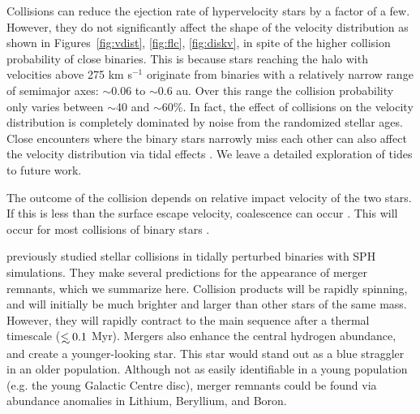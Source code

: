 \documentclass[fleqn,usenatbib]{mnras}
\newcommand\lsim{\mathrel{\rlap{\lower4pt\hbox{\hskip1pt$\sim$}}
    \raise1pt\hbox{$<$}}}
\begin{document}
Collisions can reduce the ejection rate of hypervelocity stars by a factor of a few. However, they do not significantly affect the shape of the velocity distribution as shown in Figures~\ref{fig:vdist}, \ref{fig:flc}, \ref{fig:diskv}, in spite of the higher collision probability of close binaries. This is because stars reaching the halo with velocities above 275 km s$^{-1}$  originate from binaries with a relatively narrow range of semimajor axes: $\sim$0.06 to $\sim$0.6 au. Over this range the collision probability only varies between $\sim$40 and $\sim$60\%. In fact, the effect of collisions on the velocity distribution is completely dominated by noise from the randomized stellar ages. Close encounters where the binary stars narrowly miss each other can also affect the velocity distribution via tidal effects \citep{bradnick+2017}. We leave a detailed exploration of tides to future work.




The outcome of the collision depends on relative impact velocity of the two stars. If this is less than the surface escape velocity, coalescence can occur \citep{ginsburg&loeb2006}. This will occur for most collisions of binary stars \citep{antoniniColl1+2010}.

\citet{antoniniColl2+2011} previously studied stellar collisions in tidally perturbed binaries with SPH simulations. They make several predictions for the appearance of merger remnants, which we summarize here.
Collision products will be rapidly spinning, and will initially be much brighter and larger than other stars of the same mass. However, they will rapidly contract to the main sequence after a thermal timescale ($\lsim 0.1$ Myr). 
Mergers also enhance the central hydrogen abundance, and create a younger-looking star. This star would stand out as a blue straggler in an older population. Although not as easily identifiable in a young population (e.g. the young Galactic Centre disc), merger remnants could be found via abundance anomalies in Lithium, Beryllium, and Boron.
\end{document}
